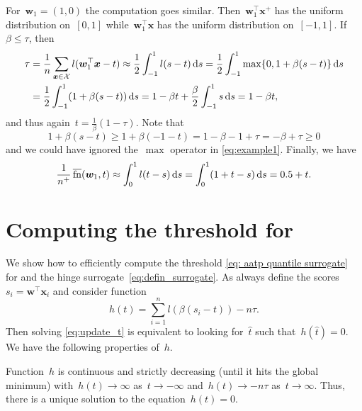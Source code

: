 For~$\bm{w}_1=(1,0)$ the computation goes similar. Then~$\bm{w}_1^\top \bm{x}^+$ has the uniform distribution on~$[0,1]$ while~$\bm{w}_1^\top \bm{x}$ has the uniform distribution on~$[-1,1]$. If~$\beta\le\tau$, then
\begin{equation}\label{eq:example1}
  \begin{aligned}
    \tau
    & = \frac{1}{n}\sum_{\bm{x} \in \mathcal{X}}l(\bm{w}_1^\top \bm{x}-t)
    \approx \frac{1}{2}\int_{-1}^1 l(s-t)\mathop{}\!\mathrm{d}s
      = \frac{1}{2}\int_{-1}^1 \max\{0,1+\beta(s-t)\}\mathop{}\!\mathrm{d}s \\
    & =\frac{1}{2}\int_{-1}^1 (1+\beta(s - t))\mathop{}\!\mathrm{d}s
      = 1 - \beta t + \frac{\beta}{2}\int_{-1}^1s\mathop{}\!\mathrm{d}s
      = 1 - \beta t,
  \end{aligned}
\end{equation}
and thus again~$t=\frac{1}{\beta}(1-\tau)$. Note that
\begin{equation*}
  1+\beta(s-t) \ge 1+\beta(-1-t) = 1-\beta - 1+\tau = -\beta+\tau \ge0
\end{equation*}
and we could have ignored the~$\max$ operator in \eqref{eq:example1}. Finally, we have
\begin{equation*}
  \frac{1}{n^+}\operatorname{\overline{fn}}(\bm{w}_1,t)
  \approx \int_0^1 l(t-s)\mathop{}\!\mathrm{d}s
  = \int_0^1 (1 + t - s)\mathop{}\!\mathrm{d}s
  = 0.5 + t.
\end{equation*}

\section{Computing the threshold for \PatMat}\label{app:threshold}

We show how to efficiently compute the threshold \eqref{eq: aatp quantile surrogate} for \PatMat and the hinge surrogate~\eqref{eq:defin_surrogate}. As always define the scores~$s_i=\bm{w}^\top \bm{x}_i$ and consider function
\begin{equation}\label{eq:defin_h}
  h(t) = \sum_{i=1}^nl(\beta(s_i-t)) - n\tau.
\end{equation}
Then solving \eqref{eq:update_t} is equivalent to looking for~$\hat{t}$ such that~$h(\hat{t})=0$. We have the following properties of~$h$.

\begin{lemma}
  Function~$h$ is continuous and strictly decreasing (until it hits the global minimum) with~$h(t)\to \infty$ as~$t\to-\infty$ and~$h(t)\to -n\tau$ as~$t\to\infty$. Thus, there is a unique solution to the equation~$h(t)=0$.
\end{lemma}

